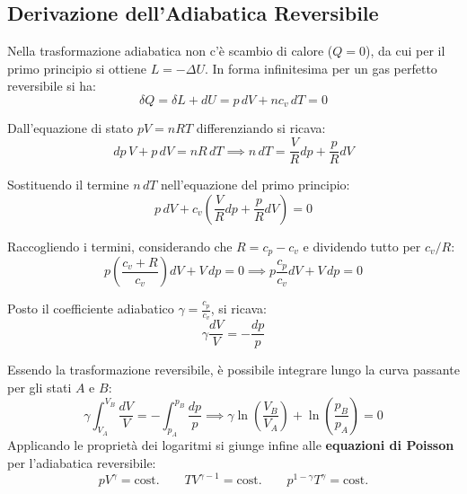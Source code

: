 \subsection{Derivazione dell'Adiabatica Reversibile}
Nella trasformazione adiabatica non c'è scambio di calore ($Q = 0$), da cui per il primo principio si ottiene $L = -\Delta U$.
In forma infinitesima per un gas perfetto reversibile si ha:
\begin{equation}
    \delta Q = \delta L + dU = p \, dV + n c_v \, dT = 0
\end{equation}

Dall'equazione di stato $pV = nRT$ differenziando si ricava:
\begin{equation}
    dp \, V + p \, dV = n R \, dT \implies n \, dT = \frac{V}{R} dp + \frac{p}{R} dV
\end{equation}

Sostituendo il termine $n \, dT$ nell'equazione del primo principio:
\begin{equation}
    p \, dV + c_v \left( \frac{V}{R} dp + \frac{p}{R} dV \right) = 0
\end{equation}

Raccogliendo i termini, considerando che $R = c_p - c_v$ e dividendo tutto per $c_v/R$:
\begin{equation}
    p \left( \frac{c_v + R}{c_v} \right) dV + V \, dp = 0 \implies p \frac{c_p}{c_v} dV + V \, dp = 0
\end{equation}

Posto il coefficiente adiabatico $\gamma = \frac{c_p}{c_v}$, si ricava:
\begin{equation}
    \gamma \frac{dV}{V} = - \frac{dp}{p}
\end{equation}

Essendo la trasformazione reversibile, è possibile integrare lungo la curva passante per gli stati $A$ e $B$:
\begin{equation}
    \gamma \int_{V_A}^{V_B} \frac{dV}{V} = -\int_{p_A}^{p_B} \frac{dp}{p} \implies \gamma \ln\left(\frac{V_B}{V_A}\right) + \ln\left(\frac{p_B}{p_A}\right) = 0
\end{equation}
Applicando le proprietà dei logaritmi si giunge infine alle \textbf{equazioni di Poisson} per l'adiabatica reversibile:
\begin{equation}
    \boxed{p V^\gamma = \text{cost.}} \quad \quad \boxed{T V^{\gamma-1} = \text{cost.}} \quad \quad \boxed{p^{1-\gamma} T^\gamma = \text{cost.}}
\end{equation}

